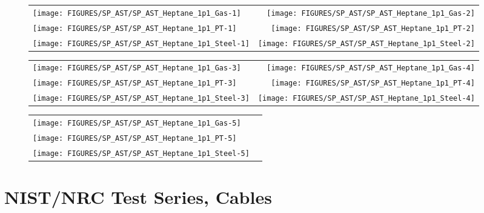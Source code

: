 \begin{figure}[p]
\begin{tabular*}{\textwidth}{l@{\extracolsep{\fill}}r}
\texttt{[image: FIGURES/SP\_AST/SP\_AST\_Heptane\_1p1\_Gas-1]}   &  \texttt{[image: FIGURES/SP\_AST/SP\_AST\_Heptane\_1p1\_Gas-2]}  \\
\texttt{[image: FIGURES/SP\_AST/SP\_AST\_Heptane\_1p1\_PT-1]}    &  \texttt{[image: FIGURES/SP\_AST/SP\_AST\_Heptane\_1p1\_PT-2]}   \\
\texttt{[image: FIGURES/SP\_AST/SP\_AST\_Heptane\_1p1\_Steel-1]} &  \texttt{[image: FIGURES/SP\_AST/SP\_AST\_Heptane\_1p1\_Steel-2]}
\end{tabular*}
\label{SP_Heptane_1p1_1m}
\end{figure}

\begin{figure}[p]
\begin{tabular*}{\textwidth}{l@{\extracolsep{\fill}}r}
\texttt{[image: FIGURES/SP\_AST/SP\_AST\_Heptane\_1p1\_Gas-3]}   & \texttt{[image: FIGURES/SP\_AST/SP\_AST\_Heptane\_1p1\_Gas-4]}  \\
\texttt{[image: FIGURES/SP\_AST/SP\_AST\_Heptane\_1p1\_PT-3]}    & \texttt{[image: FIGURES/SP\_AST/SP\_AST\_Heptane\_1p1\_PT-4]}   \\
\texttt{[image: FIGURES/SP\_AST/SP\_AST\_Heptane\_1p1\_Steel-3]} & \texttt{[image: FIGURES/SP\_AST/SP\_AST\_Heptane\_1p1\_Steel-4]}
\end{tabular*}
\label{SP_Heptane_1p1_3m}
\end{figure}

\begin{figure}[p]
\begin{tabular*}{\textwidth}{l@{\extracolsep{\fill}}r}
\texttt{[image: FIGURES/SP\_AST/SP\_AST\_Heptane\_1p1\_Gas-5]}   &  \\
\texttt{[image: FIGURES/SP\_AST/SP\_AST\_Heptane\_1p1\_PT-5]}    &  \\
\texttt{[image: FIGURES/SP\_AST/SP\_AST\_Heptane\_1p1\_Steel-5]} &
\end{tabular*}
\label{SP_Heptane_1p1_5m}
\end{figure}

\clearpage


\section{NIST/NRC Test Series, Cables}


